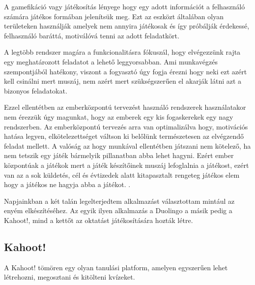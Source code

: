

A gamefikáció vagy játékosítás lényege hogy egy adott információt a felhasználó számára játékos formában jelenítsük meg. Ezt az eszközt általában olyan területeken használják amelyek nem annyira játékosak és így próbálják érdekessé, felhasználó baráttá, motiválóvá tenni az adott feladatkört. \vspace{5mm}

A legtöbb rendszer magára a funkcionalitásra fókuszál, hogy elvégezzünk rajta egy meghatározott feladatot a lehető leggyorsabban. Ami munkavégzés szempontjából hatékony, viszont a fogyasztó úgy fogja érezni hogy neki ezt azért kell csinálni mert muszáj, nem azért mert szükségszerűen el akarják látni azt a bizonyos feladatokat.\vspace{5mm}

Ezzel ellentétben az emberközpontú tervezést használó rendszerek használatakor nem érezzük úgy magunkat, hogy az emberek egy kis fogaskerekek egy nagy rendszerben. Az emberközpontú tervezés arra van optimalizálva hogy, motivációs hatása legyen, elkötelezettséget váltson ki belőlünk természetesen az elvégzendő feladat mellett. A valóság az hogy munkával ellentétben játszani nem kötelező, ha nem tetszik egy játék bármelyik pillanatban abba lehet hagyni. Ezért ember központúak a játékok mert a játék készítőinek muszáj lefoglalnia a játékost, ezért van az a sok küldetés, cél és évtizedek alatt kitapasztalt rengeteg játékos elem hogy a játékos ne hagyja abba a játékot. \cite{actionablegamification}.



Napjainkban a két talán legelterjedtem alkalmazást választottam mintául az enyém elkészítéséhez. Az egyik ilyen alkalmazás a Duolingo\cite{duolingo} a másik pedig a Kahoot!\cite{kahoot}, mind a kettőt az oktatást játékosítására hozták létre. \vspace{5mm}

\subsection{Kahoot!}

A Kahoot! tömören egy olyan tanulási platform, amelyen egyszerűen lehet létrehozni, megosztani és kitölteni kvízeket.

